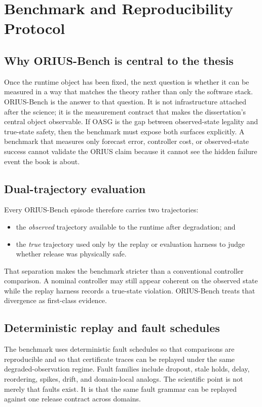 \chapter{Benchmark and Reproducibility Protocol}
\label{ch:benchmark-reproducibility-protocol}

\section{Why ORIUS-Bench is central to the thesis}
Once the runtime object has been fixed, the next question is whether it can be measured in a
way that matches the theory rather than only the software stack. ORIUS-Bench is the answer
to that question. It is not infrastructure attached after the science; it is the
measurement contract that makes the dissertation's central object observable. If OASG is the
gap between observed-state legality and true-state safety, then the benchmark must expose
both surfaces explicitly. A benchmark that measures only forecast error, controller cost, or
observed-state success cannot validate the ORIUS claim because it cannot see the hidden
failure event the book is about.

\section{Dual-trajectory evaluation}
Every ORIUS-Bench episode therefore carries two trajectories:
\begin{itemize}
  \item the \emph{observed} trajectory available to the runtime after degradation; and
  \item the \emph{true} trajectory used only by the replay or evaluation harness to judge
  whether release was physically safe.
\end{itemize}
That separation makes the benchmark stricter than a conventional controller comparison. A
nominal controller may still appear coherent on the observed state while the replay harness
records a true-state violation. ORIUS-Bench treats that divergence as first-class evidence.

\section{Deterministic replay and fault schedules}
The benchmark uses deterministic fault schedules so that comparisons are reproducible and so
that certificate traces can be replayed under the same degraded-observation regime. Fault
families include dropout, stale holds, delay, reordering, spikes, drift, and domain-local
analogs. The scientific point is not merely that faults exist. It is that the same fault
grammar can be replayed against one release contract across domains.

